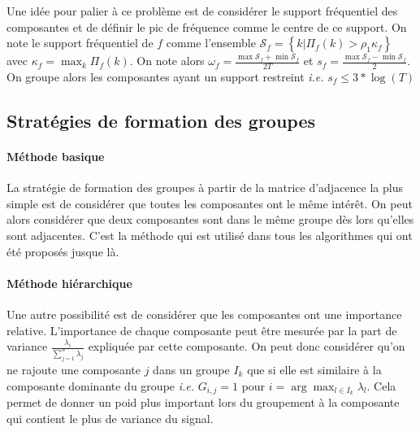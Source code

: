 \documentclass{gretsi}
\begin{document}
    Une idée pour palier à ce problème est de considérer le support fréquentiel des composantes et de définir le pic de fréquence comme le centre de ce support. On note le support fréquentiel de $f$ comme l'ensemble $\mathcal S_f = \left \{ k | \Pi_f(k) > \rho_1 \kappa_f \right \}$ avec $\kappa_f = \max_k \Pi_f(k)$. On note alors $\omega_f = \frac{\max \mathcal S_f + \min \mathcal S_f }{2 T}$ et $s_f = \frac{\max \mathcal S_f - \min \mathcal S_f }{2}$. On groupe alors les composantes ayant un support restreint \emph{i.e.} $s_f \le 3*\log(T)$



\subsection{Stratégies de formation des groupes}
\label{sub:clust}


\paragraph{Méthode basique}
La stratégie de formation des groupes à partir de la matrice d'adjacence la plus simple est de considérer que toutes les composantes ont le même intérêt. On peut alors considérer que deux composantes sont dans le même groupe dès lors qu'elles sont adjacentes. C'est la méthode qui est utilisé dans tous les algorithmes qui ont été proposés jusque là.\\



\paragraph{Méthode hiérarchique}
Une autre possibilité est de considérer que les composantes ont une importance relative. L'importance de chaque composante peut être mesurée par la part de variance $\frac{\lambda_i}{\sum_{j=1}^n \lambda_j}$ expliquée par cette composante. On peut donc considérer qu'on ne rajoute une composante $j$ dans un groupe $I_k$ que si elle est similaire à la composante dominante du groupe \emph{ i.e. } $G_{i, j} = 1$ pour $i = \arg\max_{l \in I_k} \lambda_l$. Cela permet de donner un poid plus important lors du groupement à la composante qui contient le plus de variance du signal.
\end{document}
